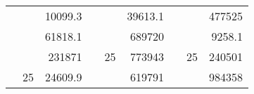 \begin{table}[H]
\begin{tabular}{|ccrccrccc}
\rowcolor[HTML]{DAE8FC} 
\multicolumn{1}{|c|}{\cellcolor[HTML]{FFFFC7}}                                & \multicolumn{1}{c|}{\cellcolor[HTML]{DAE8FC}}                      & \multicolumn{1}{r|}{\cellcolor[HTML]{DAE8FC}10099.3}   & \multicolumn{1}{c|}{\cellcolor[HTML]{FFFFC7}}                                & \multicolumn{1}{c|}{\cellcolor[HTML]{DAE8FC}}                       & \multicolumn{1}{r|}{\cellcolor[HTML]{DAE8FC}39613.1}   & \multicolumn{1}{c|}{\cellcolor[HTML]{FFFFC7}}                                & \multicolumn{1}{c|}{\cellcolor[HTML]{DAE8FC}}                      & \multicolumn{1}{r|}{\cellcolor[HTML]{DAE8FC}477525}    \\ \cline{3-3} \cline{6-6} \cline{9-9} 
\multicolumn{1}{|c|}{\cellcolor[HTML]{FFFFC7}}                                & \multicolumn{1}{c|}{\cellcolor[HTML]{DAE8FC}}                      & \multicolumn{1}{r|}{\cellcolor[HTML]{DDFDFF}61818.1}   & \multicolumn{1}{c|}{\cellcolor[HTML]{FFFFC7}}                                & \multicolumn{1}{c|}{\cellcolor[HTML]{DAE8FC}}                       & \multicolumn{1}{r|}{\cellcolor[HTML]{DDFDFF}689720}    & \multicolumn{1}{c|}{\cellcolor[HTML]{FFFFC7}}                                & \multicolumn{1}{c|}{\cellcolor[HTML]{DAE8FC}}                      & \multicolumn{1}{r|}{\cellcolor[HTML]{DDFDFF}9258.1}    \\ \cline{3-3} \cline{6-6} \cline{9-9} 
\rowcolor[HTML]{DAE8FC} 
\multicolumn{1}{|c|}{\cellcolor[HTML]{FFFFC7}}                                & \multicolumn{1}{c|}{\cellcolor[HTML]{DAE8FC}}                      & \multicolumn{1}{r|}{\cellcolor[HTML]{DAE8FC}231871}    & \multicolumn{1}{c|}{\cellcolor[HTML]{FFFFC7}}                                & \multicolumn{1}{c|}{\multirow{-9}{*}{\cellcolor[HTML]{DAE8FC}25}}   & \multicolumn{1}{r|}{\cellcolor[HTML]{DAE8FC}773943}    & \multicolumn{1}{c|}{\cellcolor[HTML]{FFFFC7}}                                & \multicolumn{1}{c|}{\multirow{-9}{*}{\cellcolor[HTML]{DAE8FC}25}}  & \multicolumn{1}{r|}{\cellcolor[HTML]{DAE8FC}240501}    \\ \cline{3-3} \cline{5-6} \cline{8-9} 
\multicolumn{1}{|c|}{\cellcolor[HTML]{FFFFC7}}                                & \multicolumn{1}{c|}{\multirow{-10}{*}{\cellcolor[HTML]{DAE8FC}25}} & \multicolumn{1}{r|}{\cellcolor[HTML]{DDFDFF}24609.9}   & \multicolumn{1}{c|}{\cellcolor[HTML]{FFFFC7}}                                & \multicolumn{1}{c|}{\cellcolor[HTML]{DDFDFF}}                       & \multicolumn{1}{r|}{\cellcolor[HTML]{DAE8FC}619791}    & \multicolumn{1}{c|}{\cellcolor[HTML]{FFFFC7}}                                & \multicolumn{1}{c|}{\cellcolor[HTML]{DDFDFF}}                      & \multicolumn{1}{r|}{\cellcolor[HTML]{DAE8FC}984358}    \\ \cline{2-3} \cline{6-6} \cline{9-9} 

\end{tabular}
\end{table}
